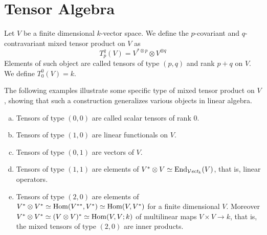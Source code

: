 \section{Tensor Algebra}

\begin{definition}
  Let \(V\) be a finite dimensional \(k\)-vector space. We define the
  \(p\)-covariant and \(q\)-contravariant mixed tensor product on \(V\) as
  \[
    T_p^q(V) = V^{* \otimes p} \otimes V^{\otimes q}
  \]
  Elements of such object are called tensors of type \((p, q)\) and rank \(p +
  q\) on \(V\). We define \(T_0^0(V) = k\).
\end{definition}

\begin{example}
  The following examples illustrate some specific type of mixed tensor product
  on \(V\), showing that such a construction generalizes various objects in
  linear algebra.
  \begin{enumerate}[(a)]
    \item Tensors of type \((0,0)\) are called scalar tensors of rank \(0\).
    \item Tensors of type \((1, 0)\) are linear functionals on \(V\).
    \item Tensors of type \((0, 1)\) are vectors of \(V\).
    \item Tensors of type \((1, 1)\) are elements of \(V^* \otimes V \simeq
      \operatorname{End}_{{\mathcal{V}\textit{ect}}_k}(V)\), that is, linear operators.
    \item Tensors of type \((2, 0)\) are elements of \(V^* \otimes V^* \simeq
      \operatorname{Hom}(V^{**}, V^*) \simeq \operatorname{Hom}(V, V^*)\) for a finite dimensional \(V\).
      Moreover \(V^* \otimes V^* \simeq (V \otimes V)^* \simeq \operatorname{Hom}(V, V; k)\) of
      multilinear maps \(V \times V \to k\), that is, the mixed tensors of type
      \((2, 0)\) are inner products.
 \end{enumerate}
\end{example}

